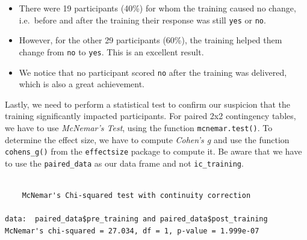 \documentclass[
  letterpaper,
]{krantz}
\makeatletter
\newenvironment{Shaded}{\begin{snugshade}}{\end{snugshade}}
\newcommand{\CommentTok}[1]{\textcolor[rgb]{0.37,0.37,0.37}{#1}}
\newcommand{\FunctionTok}[1]{\textcolor[rgb]{0.28,0.35,0.67}{#1}}
\newcommand{\NormalTok}[1]{\textcolor[rgb]{0.00,0.23,0.31}{#1}}
\newcommand{\SpecialCharTok}[1]{\textcolor[rgb]{0.37,0.37,0.37}{#1}}
\newenvironment{kframe}{%
\medskip{}
\setlength{\fboxsep}{.8em}
 \def\at@end@of@kframe{}%
 \ifinner\ifhmode%
  \def\at@end@of@kframe{\end{minipage}}%
  \begin{minipage}{\columnwidth}%
 \fi\fi%
 \def\FrameCommand##1{\hskip\@totalleftmargin \hskip-\fboxsep
 \colorbox{shadecolor}{##1}\hskip-\fboxsep
     \hskip-\linewidth \hskip-\@totalleftmargin \hskip\columnwidth}%
 \MakeFramed {\advance\hsize-\width
   \@totalleftmargin\z@ \linewidth\hsize
   \@setminipage}}%
 {\par\unskip\endMakeFramed%
 \at@end@of@kframe}
\renewenvironment{Shaded}{\begin{kframe}}{\end{kframe}}
\makeatother
\begin{document}
\begin{itemize}
\item
  There were 19 participants (40\%) for whom the training caused no
  change, i.e.~before and after the training their response was still
  \texttt{yes} or \texttt{no}.
\item
  However, for the other 29 participants (60\%), the training helped
  them change from \texttt{no} to \texttt{yes}. This is an excellent
  result.
\item
  We notice that no participant scored \texttt{no} after the training
  was delivered, which is also a great achievement.
\end{itemize}

Lastly, we need to perform a statistical test to confirm our suspicion
that the training significantly impacted participants. For paired 2x2
contingency tables, we have to use \emph{McNemar's Test}, using the
function \texttt{mcnemar.test()}. To determine the effect size, we have
to compute \emph{Cohen's g} and use the function \texttt{cohens\_g()}
from the \texttt{effectsize} package to compute it. Be aware that we
have to use the \texttt{paired\_data} as our data frame and not
\texttt{ic\_training}.

\begin{Shaded}
\end{Shaded}

\begin{verbatim}

    McNemar's Chi-squared test with continuity correction

data:  paired_data$pre_training and paired_data$post_training
McNemar's chi-squared = 27.034, df = 1, p-value = 1.999e-07
\end{verbatim}

\begin{Shaded}
\end{Shaded}
\end{document}
